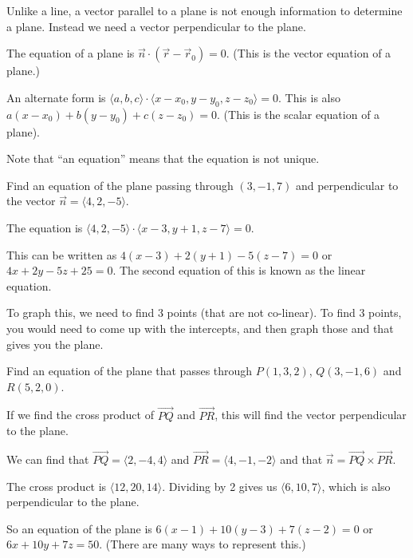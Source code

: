 \documentclass[../calc3.tex]{subfiles}
\begin{document}
Unlike a line, a vector parallel to a plane is not enough information to determine a plane. Instead we need a vector perpendicular to the plane.

The equation of a plane is $\vec{n}\cdot (\vec{r}-\vec{r}_0)=0$. (This is the vector equation of a plane.)

An alternate form is $\langle a,b,c\rangle\cdot \langle x-x_0,y-y_0,z-z_0\rangle =0$. This is also $a(x-x_0)+b(y-y_0)+c(z-z_0)=0$. (This is the scalar equation of a plane).

Note that ``an equation'' means that the equation is not unique.

\pagebreak
\begin{example}
    Find an equation of the plane passing through $(3,-1,7)$ and perpendicular to the vector $\vec{n}=\langle 4,2,-5\rangle$.

    The equation is $\langle 4,2,-5\rangle \cdot \langle x-3,y+1,z-7\rangle =0$.

    This can be written as $4(x-3)+2(y+1)-5(z-7)=0$ or $4x+2y-5z+25=0$. The second equation of this is known as the linear equation.

    To graph this, we need to find 3 points (that are not co-linear). To find 3 points, you would need to come up with the intercepts, and then graph those and that gives you the plane.
\end{example}

\begin{example}
    Find an equation of the plane that passes through $P(1,3,2)$, $Q(3,-1,6)$ and $R(5,2,0)$.

    If we find the cross product of $\overrightarrow{PQ}$ and $\overrightarrow{PR}$, this will find the vector perpendicular to the plane.

    We can find that $\overrightarrow{PQ}=\langle 2,-4,4\rangle$ and $\overrightarrow{PR}=\langle 4,-1,-2\rangle$ and that $\vec{n}=\overrightarrow{PQ}\times \overrightarrow{PR}$.

    The cross product is $\langle 12,20,14\rangle$. Dividing by 2 gives us $\langle 6,10,7\rangle$, which is also perpendicular to the plane.

    So an equation of the plane is $6(x-1)+10(y-3)+7(z-2)=0$ or $6x+10y+7z=50$. (There are many ways to represent this.)
\end{example}
\end{document}
